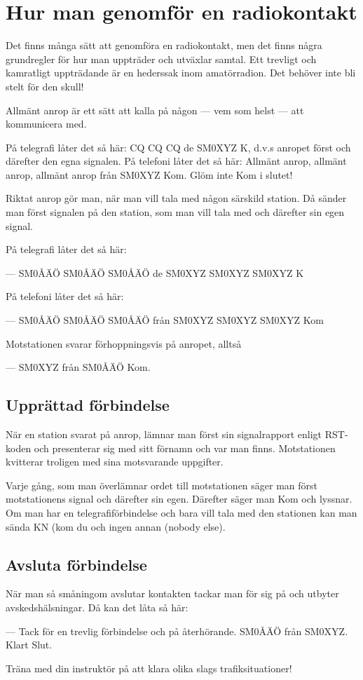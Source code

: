
\section{Hur man genomför en radiokontakt}

Det finns många sätt att genomföra en radiokontakt, men det finns
några grundregler för hur man uppträder och utväxlar samtal. Ett
trevligt och kamratligt uppträdande är en hederssak inom
amatörradion. Det behöver inte bli stelt för den skull!

Allmänt anrop är ett sätt att kalla på någon
--- vem som helst --- att kommunicera med.

På telegrafi låter det så här: CQ CQ CQ de SM0XYZ K, d.v.s anropet
först och därefter den egna signalen.  På telefoni låter det så här:
Allmänt anrop, allmänt anrop, allmänt anrop från SM0XYZ Kom. Glöm inte
Kom i slutet!

Riktat anrop gör man, när man vill tala med någon särskild station. Då
sänder man först signalen på den station, som man vill tala med och
därefter sin egen signal.

På telegrafi låter det så här:

--- SM0ÅÄÖ SM0ÅÄÖ SM0ÅÄÖ de SM0XYZ SM0XYZ SM0XYZ K

På telefoni låter det så här:

--- SM0ÅÄÖ SM0ÅÄÖ SM0ÅÄÖ från SM0XYZ SM0XYZ SM0XYZ Kom

Motstationen svarar förhoppningsvis på anropet, alltså

--- SM0XYZ från SM0ÅÄÖ Kom.

\subsection{Upprättad förbindelse}

När en station svarat på anrop, lämnar man först sin signalrapport
enligt RST-koden och presenterar sig med sitt förnamn och var man
finns. Motstationen kvitterar troligen med sina motsvarande
uppgifter.

Varje gång, som man överlämnar ordet till motstationen
säger man först motstationens signal och därefter sin egen. Därefter
säger man Kom och lyssnar. Om man har en telegrafiförbindelse och bara
vill tala med den stationen kan man sända KN (kom du och ingen annan
(nobody else).

\subsection{Avsluta förbindelse}

När man så småningom avslutar kontakten tackar man för sig på och
utbyter avskedshälsningar.  Då kan det låta så här:

--- Tack för en trevlig förbindelse och på återhörande. SM0ÅÄÖ från
SM0XYZ. Klart Slut.

Träna med din instruktör på att klara olika slags trafiksituationer!
